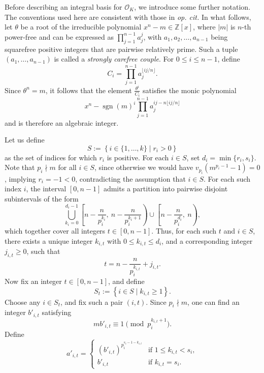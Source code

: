 \documentclass[table]{amsart}
\newcommand{\cO}{\mathcal{O}}
\numberwithin{equation}{section}
\begin{document}
\par Before describing an integral basis for $\cO_K$, we introduce some further notation. The conventions used here are consistent with those in \emph{op. cit.} In what follows, let $\theta$ be a root of the irreducible polynomial $x^n - m \in \mathbb{Z}[x]$, where $|m|$ is $ n $-th power-free and can be expressed as $ \prod_{j=1}^{n-1} a_j^j $, with $ a_1, a_2, \dots, a_{n-1} $ being squarefree positive integers that are pairwise relatively prime. Such a tuple $(a_1, \dots, a_{n-1})$ is called a \emph{strongly carefree couple}. For $0 \leqslant i \leqslant n-1$, define  
\[
C_i = \prod_{j=1}^{n-1} a_j^{\lfloor ij / n \rfloor}.
\]  
Since $\theta^n = m$, it follows that the element $ \frac{\theta^i}{C_i} $ satisfies the monic polynomial  
\[
x^n - \operatorname{sgn}(m)^i \prod_{j=1}^{n-1} a_j^{ij - n \lfloor ij  / n \rfloor}
\]  
and is therefore an algebraic integer.
\par Let us define 
\begin{equation}\label{defn of S}
S:= \left\{ i \in \{1, \dotsc, k\} \mid r_i > 0 \right\}    
\end{equation}
as the set of indices for which $ r_i $ is positive. For each $ i \in S $, set $
d_i = \min\{r_i, s_i\}$. Note that $ p_i \nmid m $ for all $ i \in S $, since otherwise we would have $ v_{p_i}(m^{p_i - 1} - 1) = 0 $, implying $ r_i = -1 < 0 $, contradicting the assumption that $ i \in S $. For each such index $ i $, the interval $ [0, n - 1] $ admits a partition into pairwise disjoint subintervals of the form  
\[
\bigcup_{k_i = 0}^{d_i - 1} \left[n - \frac{n}{p_i^{k_i}},\ n - \frac{n}{p_i^{k_i + 1}} \right) \cup \left[n - \frac{n}{p_i^{d_i}},\ n\right),
\]  
which together cover all integers $ t \in [0, n - 1] $. Thus, for each such $ t$ and $ i \in S $, there exists a unique integer $ k_{i,t} $ with $ 0 \leq k_{i,t} \leq d_i $, and a corresponding integer $ j_{i,t} \geq 0 $, such that  
\[
t = n - \frac{n}{p_i^{k_{i,t}}} + j_{i,t}.
\]  
\noindent Now fix an integer $ t\in [0, n - 1] $, and define  
\[
S_t := \left\{ i \in S \mid k_{i,t} \geq 1 \right\}.
\]  
Choose any $ i \in S_t $, and fix such a pair $ (i, t) $. Since $ p_i \nmid m $, one can find an integer $ b'_{i,t} $ satisfying  
\[
mb'_{i,t} \equiv 1 \pmod{p_i^{k_{i,t} + 1}}.
\]  
Define  
\[
a'_{i,t} = 
\begin{cases}
(b'_{i,t})^{p_i^{s_i - 1 - k_{i,t}}} & \text{if } 1 \leq k_{i,t} < s_i, \\
b'_{i,t} & \text{if } k_{i,t} = s_i.
\end{cases}
\]  
\end{document}

